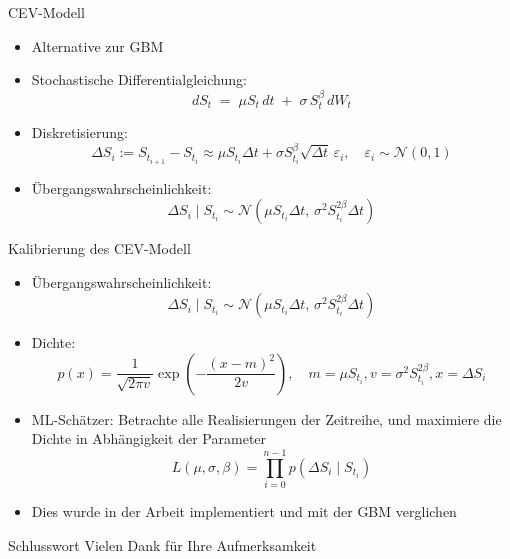 \documentclass{beamer}
\begin{document}
\begin{frame}{CEV-Modell}
  \begin{itemize}
    \item Alternative zur GBM
    \item Stochastische Differentialgleichung: $$dS_t \;=\; \mu S_t\,dt \;+\; \sigma\,S_t^{\beta}\,dW_t$$
    \item Diskretisierung: $$\Delta S_i := S_{t_{i+1}} - S_{t_i} \approx \mu S_{t_i}\Delta t + \sigma S_{t_i}^{\beta}\sqrt{\Delta t}\,\varepsilon_i,\quad \varepsilon_i\sim\mathcal N(0,1)$$
    \item Übergangswahrscheinlichkeit: $$\Delta S_i \mid S_{t_i} \sim \mathcal N\left(\mu S_{t_i} \Delta t,\, \sigma^2 S_{t_i}^{2\beta} \Delta t\right)$$
  \end{itemize}
\end{frame}

\begin{frame}{Kalibrierung des CEV-Modell}
  \begin{itemize}
    \item Übergangswahrscheinlichkeit: $$\Delta S_i \mid S_{t_i} \sim \mathcal N\left(\mu S_{t_i} \Delta t,\, \sigma^2 S_{t_i}^{2\beta} \Delta t\right)$$
    \item Dichte: $$p(x) = \frac{1}{\sqrt{2\pi v}} \exp\left(-\frac{(x-m)^2}{2v}\right),\quad m = \mu S_{t_i}, v = \sigma^2 S_{t_i}^{2 \beta}, x=\Delta S_i$$
    \item ML-Schätzer: Betrachte alle Realisierungen der Zeitreihe, und maximiere die Dichte in Abhängigkeit der Parameter
  $$L(\mu, \sigma, \beta) = \prod_{i=0}^{n-1} p(\Delta S_i \mid S_{t_i})$$
    \item Dies wurde in der Arbeit implementiert und mit der GBM verglichen
  \end{itemize}
\end{frame}

\begin{frame}{Schlusswort}
  \centering
  \Huge Vielen Dank für Ihre Aufmerksamkeit\\
\end{frame}
\end{document}
